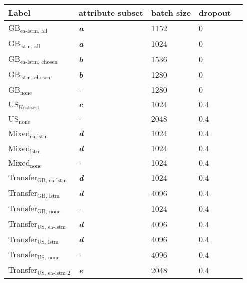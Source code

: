 \begin{tabular}{lllll}
    \toprule
    Label & attribute subset & batch size & dropout \\
    \midrule
    GB$_\text{ea-lstm, all}$ & \textbf{\textit{a}} &  1152  & 0\\
    GB$_\text{lstm, all}$ & \textbf{\textit{a}} & 1024 & 0  \\
    GB$_\text{ea-lstm, chosen}$ & \textbf{\textit{b}} & 1536 & 0 \\
    GB$_\text{lstm, chosen}$ & \textbf{\textit{b}} & 1280 & 0\\
    GB$_\text{none}$ & - & 1280 & 0\\
    US$_\text{Kratzert}$  & \textbf{\textit{c}} & 1024 & 0.4 \\
    US$_\text{none}$  & - & 2048 & 0.4\\
    Mixed$_\text{ea-lstm}$ & \textbf{\textit{d}} & 1024 & 0.4\\
    Mixed$_\text{lstm}$ & \textbf{\textit{d}} & 1024 & 0.4\\
    Mixed$_\text{none}$ & - & 1024 & 0.4\\
    Transfer$_\text{GB, ea-lstm}$ & \textbf{\textit{d}}  & 1024 & 0.4 \\
    Transfer$_\text{GB, lstm}$ & \textbf{\textit{d}}  & 4096 & 0.4 \\
    Transfer$_\text{GB, none}$ & - & 1024 & 0.4 \\
    Transfer$_\text{US, ea-lstm}$ & \textbf{\textit{d}} & 4096 & 0.4 \\
    Transfer$_\text{US, lstm}$  & \textbf{\textit{d}} & 4096 & 0.4 \\ 
    Transfer$_\text{US, none}$  & - & 4096 & 0.4 \\
    Transfer$_\text{US, ea-lstm 2}$ & \textbf{\textit{e}} & 2048 & 0.4 \\
\bottomrule
\end{tabular}
